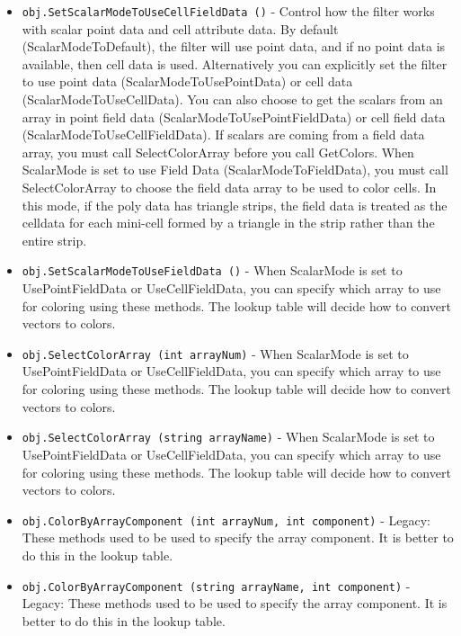 \begin{itemize}
\item  \verb|obj.SetScalarModeToUseCellFieldData ()| -  Control how the filter works with scalar point data and cell attribute
 data.  By default (ScalarModeToDefault), the filter will use point data,
 and if no point data is available, then cell data is used. Alternatively
 you can explicitly set the filter to use point data
 (ScalarModeToUsePointData) or cell data (ScalarModeToUseCellData).
 You can also choose to get the scalars from an array in point field
 data (ScalarModeToUsePointFieldData) or cell field data
 (ScalarModeToUseCellFieldData).  If scalars are coming from a field
 data array, you must call SelectColorArray before you call
 GetColors.
 When ScalarMode is set to use Field Data (ScalarModeToFieldData), you 
 must call SelectColorArray to choose the field data array to be used to
 color cells. In this mode, if the poly data has triangle strips, 
 the field data is treated as the celldata for each mini-cell formed by
 a triangle in the strip rather than the entire strip.

\item  \verb|obj.SetScalarModeToUseFieldData ()| -  When ScalarMode is set to UsePointFieldData or UseCellFieldData,
 you can specify which array to use for coloring using these methods.
 The lookup table will decide how to convert vectors to colors.

\item  \verb|obj.SelectColorArray (int arrayNum)| -  When ScalarMode is set to UsePointFieldData or UseCellFieldData,
 you can specify which array to use for coloring using these methods.
 The lookup table will decide how to convert vectors to colors.

\item  \verb|obj.SelectColorArray (string arrayName)| -  When ScalarMode is set to UsePointFieldData or UseCellFieldData,
 you can specify which array to use for coloring using these methods.
 The lookup table will decide how to convert vectors to colors.

\item  \verb|obj.ColorByArrayComponent (int arrayNum, int component)| -  Legacy:
 These methods used to be used to specify the array component.
 It is better to do this in the lookup table.

\item  \verb|obj.ColorByArrayComponent (string arrayName, int component)| -  Legacy:
 These methods used to be used to specify the array component.
 It is better to do this in the lookup table.


\end{itemize}
